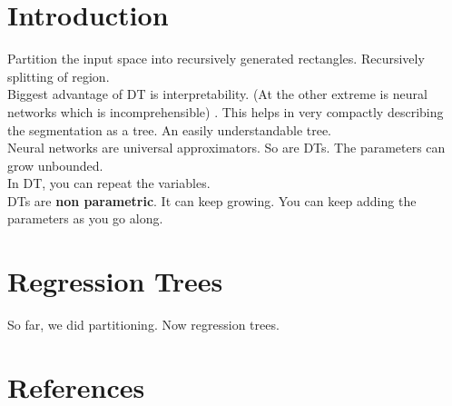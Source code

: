 \documentclass{article}
\begin{document}
\section{Introduction}
Partition the input space into recursively generated rectangles. Recursively splitting of region. \\
Biggest advantage of DT is interpretability. (At the other extreme is neural networks which is incomprehensible) . This helps in very compactly describing  the segmentation as a tree. An easily understandable tree. \\
Neural networks are universal approximators. So are DTs. The parameters can grow unbounded. \\
In DT, you can repeat the variables. \\
DTs are \textbf{non parametric}. It can keep growing. You can keep adding the parameters as you go along. \\
\section{Regression Trees}
So far, we did partitioning. Now regression trees.\\
\section{References}
\end{document}

